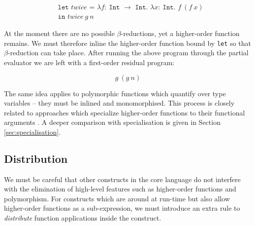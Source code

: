 \documentclass[runningheads]{llncs}
\begin{document}
\begin{equation*}
  \begin{split}
    &\texttt{let $twice$ = $\lambda f :\ $Int $\rightarrow$ Int. $\lambda x :\ $Int. $f\ (f\ x)$} \\
    &\texttt{in $twice\ g\ n$}
  \end{split}
\end{equation*}

At the moment there are no possible $\beta$-reductions, yet a higher-order function remains. We must therefore inline the higher-order function bound by \texttt{let} so that $\beta$-reduction can take place. After running the above program through the partial evaluator we are left with a first-order residual program:

\begin{equation*}
  g\ (g\ n)
\end{equation*}

The same idea applies to polymorphic functions which quantify over type variables -- they must be inlined and monomorphised. This process is closely related to approaches which specialize higher-order functions to their functional arguments \cite{chin1996higher}. A deeper comparison with specialisation is given in Section \ref{sec:specialisation}.

\subsection{Distribution} \label{sec:distribution}

We must be careful that other constructs in the core language do not interfere with the elimination of high-level features such as higher-order functions and polymorphism. For constructs which are around at run-time but also allow higher-order functions as a sub-expression, we must introduce an extra rule to \emph{distribute} function applications inside the construct.



\end{document}
